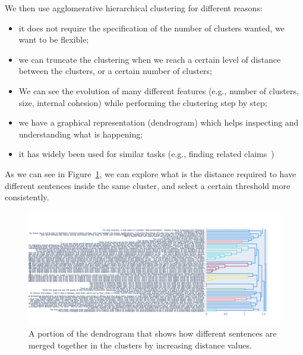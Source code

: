 We then use agglomerative hierarchical clustering for different reasons:
\begin{itemize}
    \item it does not require the specification of the number of clusters wanted, we want to be flexible;
    \item we can truncate the clustering when we reach a certain level of distance between the clusters, or a certain number of clusters;
    \item We can see the evolution of many different features (e.g., number of clusters, size, internal cohesion) while performing the clustering step by step;
    \item we have a graphical representation (dendrogram) which helps inspecting and understanding what is happening;
    \item it has widely been used for similar tasks (e.g., finding related claims~\cite{TODO:meedan_talk_similarity:http://ceur-ws.org/Vol-2607/short4.pdf:or_better})
\end{itemize}


As we can see in Figure~\ref{fig:dendrogram}, we can explore what is the distance required to have different sentences inside the same cluster, and select a certain threshold more consistently.
\begin{figure}[!htb]
    \centering
    \includegraphics[width=\linewidth]{figures/dendrogram.png}
    \caption{A portion of the dendrogram that shows how different sentences are merged together in the clusters by increasing distance values.}
    \label{fig:dendrogram}
\end{figure}

